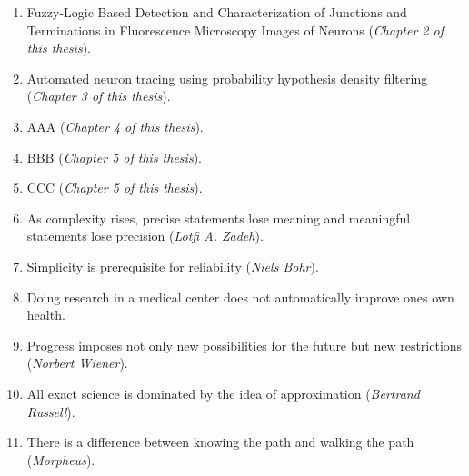 \documentclass[10pt, twoside]{report}
\begin{document}
\begin{enumerate}
  
\item Fuzzy-Logic Based Detection and Characterization of Junctions and Terminations in Fluorescence Microscopy Images of Neurons (\emph{Chapter 2 of this thesis}). 
  
\medskip
  
\item Automated neuron tracing using probability hypothesis density filtering
	(\emph{Chapter 3 of this thesis}).  
  
\medskip
\item AAA 
	(\emph{Chapter 4 of this thesis}). 

\medskip
\item BBB 
	(\emph{Chapter 5 of this thesis}). 

\medskip

\item CCC 
	(\emph{Chapter 5 of this thesis}). 

\medskip 

\item As complexity rises, precise statements lose meaning and meaningful statements lose precision 
	(\emph{Lotfi A. Zadeh}). 

\medskip
  
\item Simplicity is prerequisite for reliability 
	(\emph{Niels Bohr}). 

\medskip

\item Doing research in a medical center does not automatically
  improve ones own health.

\medskip

\item Progress imposes not only new possibilities for the future but
  new restrictions (\emph{Norbert Wiener}).

\medskip

\item All exact science is dominated by the idea of approximation (\emph{Bertrand Russell}).
\medskip

\item There is a difference between knowing the path and walking the
  path (\emph{Morpheus}).



\end{enumerate}

\end{document}
